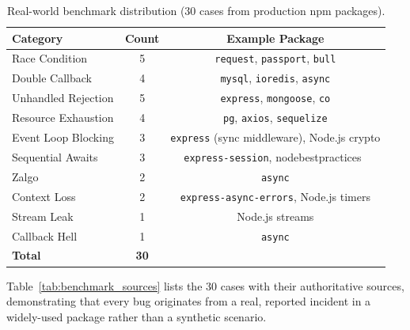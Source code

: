 \documentclass[runningheads]{llncs}
\begin{document}
\begin{table}[H]
  \centering
  \vspace{-0.3cm}
  \caption{Real-world benchmark distribution (30 cases from production npm packages).}
  \label{tab:benchmark}
  \begin{tabular}{@{}lcc@{}}
    \toprule
    \textbf{Category} & \textbf{Count} & \textbf{Example Package} \\
    \midrule
    Race Condition      & 5  & \texttt{request}, \texttt{passport}, \texttt{bull} \\
    Double Callback     & 4  & \texttt{mysql}, \texttt{ioredis}, \texttt{async} \\
    Unhandled Rejection & 5  & \texttt{express}, \texttt{mongoose}, \texttt{co} \\
    Resource Exhaustion & 4  & \texttt{pg}, \texttt{axios}, \texttt{sequelize} \\
    Event Loop Blocking & 3  & \texttt{express} (sync middleware), Node.js crypto \\
    Sequential Awaits   & 3  & \texttt{express-session}, nodebestpractices~\cite{nodebestpractices} \\
    Zalgo               & 2  & \texttt{async} \\
    Context Loss        & 2  & \texttt{express-async-errors}, Node.js timers \\
    Stream Leak         & 1  & Node.js streams \\
    Callback Hell       & 1  & \texttt{async} \\
    \midrule
    \textbf{Total}      & \textbf{30} & \\
    \bottomrule
  \end{tabular}
\end{table}

Table~\ref{tab:benchmark_sources} lists the 30 cases with their authoritative
sources, demonstrating that every bug originates from a real, reported incident
in a widely-used package rather than a synthetic scenario.
\end{document}
